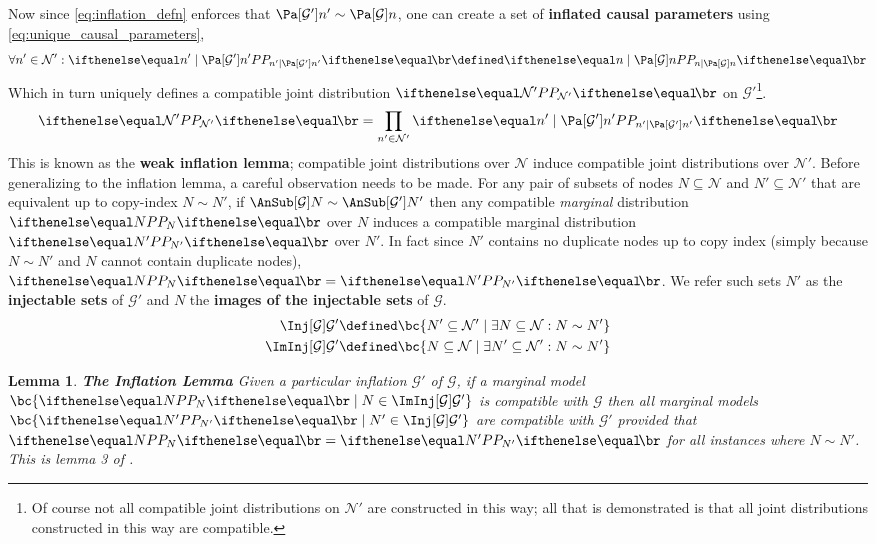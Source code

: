 \documentclass[aps, 10pt, english, twoside, pra, nofootinbib, longbibliography]{revtex4-1}
\theoremstyle{plain}
\newtheorem{lemma}[theorem]{Lemma}
\theoremstyle{definition}
\theoremstyle{remark}
\newcommand{\graph}{\mathcal{G}}
\newcommand{\nodes}{\mathcal{N}}
\newcommand{\term}[1]{\textcolor{Mahogany}{\textbf{#1}}}
\begin{document}
    Now since \cref{eq:inflation_defn} enforces that $\Pa[\graph']{n'} \sim \Pa[\graph]{n}$, one can create a set of \term{inflated causal parameters} using \cref{eq:unique_causal_parameters},
    \[ \forall n' \in \nodes' : \prob[n'\mid \Pa[\graph']{n'}] \defined \prob[n\mid \Pa[\graph]{n}] \]
    Which in turn uniquely defines a compatible joint distribution $\prob[\nodes']$ on $\graph'$\footnote{Of course not all compatible joint distributions on $\nodes'$ are constructed in this way; all that is demonstrated is that all joint distributions constructed in this way are compatible.}.
    \[ \prob[\nodes'] = \prod_{n' \in \nodes'} \prob[n'\mid \Pa[\graph']{n'}] \]
    This is known as the \term{weak inflation lemma}; compatible joint distributions over $\nodes$ induce compatible joint distributions over $\nodes'$. Before generalizing to the inflation lemma, a careful observation needs to be made. For any pair of subsets of nodes $N \subseteq \nodes$ and $N' \subseteq \nodes'$ that are equivalent up to copy-index $N \sim N'$, if $\AnSub[\graph]{N} \sim \AnSub[\graph']{N'}$ then any compatible \textit{marginal} distribution $\prob[N]$ over $N$ induces a compatible marginal distribution $\prob[N']$ over $N'$. In fact since $N'$ contains no duplicate nodes up to copy index (simply because $N \sim N'$ and $N$ cannot contain duplicate nodes), $\prob[N] = \prob[N']$. We refer such sets $N'$ as the \term{injectable sets} of $\graph'$ and $N$ the \term{images of the injectable sets} of $\graph$.
    \begin{align*}
        \Inj[\graph]{\graph'} &\defined \bc{N' \subseteq \nodes' \mid \exists N \subseteq \nodes : N \sim N'} \\
        \ImInj[\graph]{\graph'} &\defined \bc{N \subseteq \nodes \mid \exists N' \subseteq \nodes' : N \sim N'}
    \end{align*}

    \begin{lemma}
        \label{lem:inflation}
        \term{The Inflation Lemma} Given a particular inflation $\graph'$ of $\graph$, if a marginal model $\bc{\prob[N] \mid N \in \ImInj[\graph]{\graph'}}$ is compatible with $\graph$ then all marginal models $\bc{\prob[N'] \mid N' \in \Inj[\graph]{\graph'}}$ are compatible with $\graph'$ provided that $\prob[N] = \prob[N']$ for all instances where $N \sim N'$.
        This is lemma 3 of \cite{Inflation}.
    \end{lemma}
\end{document}
